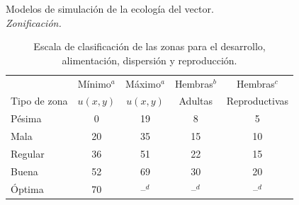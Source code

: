 \begin{frame}[t]{Modelos de simulación de la ecología del vector.\\\textit{Zonificación.}}

  \begin{table}
        \begin{minipage}{\textwidth}
          \centering
          \scriptsize
            \caption{\label{tab:cap4-puntaje-zona} Escala de clasificación de las zonas
            para el desarrollo, alimentación, dispersión y reproducción.}
            \begin{tabular}{l c c c c}
                \hline
                             & Mínimo$^a$ & Máximo$^a$ & Hembras$^b$ & Hembras$^c$ \\
                Tipo de zona & $u(x,y)$   & $u(x,y)$   & Adultas     & Reproductivas \\
                \hline
                \hline
                Pésima  & 0  & 19 & 8  & 5 \\
                Mala    & 20 & 35 & 15 & 10\\
                Regular & 36 & 51 & 22 & 15\\
                Buena   & 52 & 69 & 30 & 20\\
                Óptima  & 70 & --$^d$ & --$^d$ & --$^d$
            \end{tabular}
        \end{minipage}
    \end{table}
\end{frame}

